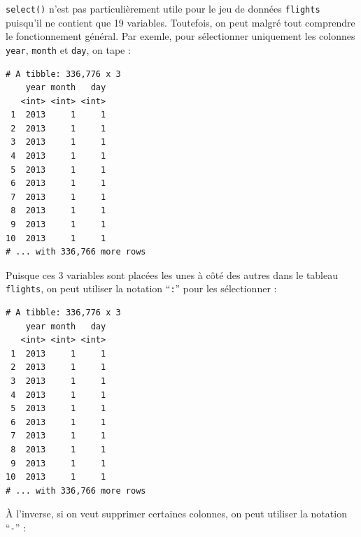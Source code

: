 \documentclass[
  a4paper,
]{article}
\newenvironment{Shaded}{\begin{snugshade}}{\end{snugshade}}
\newcommand{\CommentTok}[1]{\textcolor[rgb]{0.54,0.53,0.53}{#1}}
\newcommand{\KeywordTok}[1]{\textcolor[rgb]{0.12,0.11,0.11}{\textbf{#1}}}
\newcommand{\NormalTok}[1]{\textcolor[rgb]{0.12,0.11,0.11}{#1}}
\newcommand{\OperatorTok}[1]{\textcolor[rgb]{0.12,0.11,0.11}{#1}}
\newcommand{\StringTok}[1]{\textcolor[rgb]{0.75,0.01,0.01}{#1}}
\begin{document}
\texttt{select()} n'est pas particulièrement utile pour le jeu de données \texttt{flights} puisqu'il ne contient que 19 variables. Toutefois, on peut malgré tout comprendre le fonctionnement général. Par exemle, pour sélectionner uniquement les colonnes \texttt{year}, \texttt{month} et \texttt{day}, on tape :

\begin{Shaded}
\end{Shaded}

\begin{verbatim}
# A tibble: 336,776 x 3
    year month   day
   <int> <int> <int>
 1  2013     1     1
 2  2013     1     1
 3  2013     1     1
 4  2013     1     1
 5  2013     1     1
 6  2013     1     1
 7  2013     1     1
 8  2013     1     1
 9  2013     1     1
10  2013     1     1
# ... with 336,766 more rows
\end{verbatim}

Puisque ces 3 variables sont placées les unes à côté des autres dans le tableau \texttt{flights}, on peut utiliser la notation ``\texttt{:}'' pour les sélectionner :

\begin{Shaded}
\end{Shaded}

\begin{verbatim}
# A tibble: 336,776 x 3
    year month   day
   <int> <int> <int>
 1  2013     1     1
 2  2013     1     1
 3  2013     1     1
 4  2013     1     1
 5  2013     1     1
 6  2013     1     1
 7  2013     1     1
 8  2013     1     1
 9  2013     1     1
10  2013     1     1
# ... with 336,766 more rows
\end{verbatim}

À l'inverse, si on veut supprimer certaines colonnes, on peut utiliser la notation ``\texttt{-}'' :

\begin{Shaded}
\end{Shaded}
\end{document}
